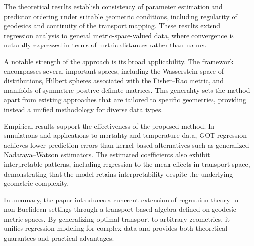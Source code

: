 \documentclass[11pt]{article}
\begin{document}
	The theoretical results establish consistency of parameter estimation and predictor ordering under suitable geometric conditions, including regularity of geodesics and continuity of the transport mapping. These results extend regression analysis to general metric-space-valued data, where convergence is naturally expressed in terms of metric distances rather than norms.
	
	A notable strength of the approach is its broad applicability. The framework encompasses several important spaces, including the Wasserstein space of distributions, Hilbert spheres associated with the Fisher--Rao metric, and manifolds of symmetric positive definite matrices. This generality sets the method apart from existing approaches that are tailored to specific geometries, providing instead a unified methodology for diverse data types.
	
	Empirical results support the effectiveness of the proposed method. In simulations and applications to mortality and temperature data, GOT regression achieves lower prediction errors than kernel-based alternatives such as generalized Nadaraya--Watson estimators. The estimated coefficients also exhibit interpretable patterns, including regression-to-the-mean effects in transport space, demonstrating that the model retains interpretability despite the underlying geometric complexity.
	
	In summary, the paper introduces a coherent extension of regression theory to non-Euclidean settings through a transport-based algebra defined on geodesic metric spaces. By generalizing optimal transport to arbitrary geometries, it unifies regression modeling for complex data and provides both theoretical guarantees and practical advantages. 
	
\end{document}
